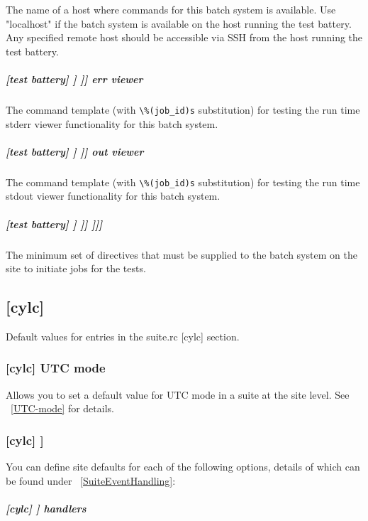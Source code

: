 The name of a host where commands for this batch system is available. Use
"localhost" if the batch system is available on the host running the test
battery. Any specified remote host should be accessible via SSH from the host
running the test battery.

\subparagraph[err viewer]{[test battery] \textrightarrow [[batch systems]] \textrightarrow [[[SYSTEM]]] \textrightarrow err viewer}

The command template (with \lstinline=\%(job_id)s= substitution) for testing
the run time stderr viewer functionality for this batch system.

\subparagraph[out viewer]{[test battery] \textrightarrow [[batch systems]] \textrightarrow [[[SYSTEM]]] \textrightarrow out viewer}

The command template (with \lstinline=\%(job_id)s= substitution) for testing
the run time stdout viewer functionality for this batch system.

\subparagraph[{[[[[}directives{]]]]}]{[test battery] \textrightarrow [[batch systems]] \textrightarrow [[[SYSTEM]]] \textrightarrow [[[[directives]]]]}

The minimum set of directives that must be supplied to the batch system on the
site to initiate jobs for the tests.

\subsection{[cylc]}

Default values for entries in the suite.rc [cylc] section.

\subsubsection[UTC mode]{[cylc] \textrightarrow UTC mode}
\label{SiteUTCMode}

Allows you to set a default value for UTC mode in a suite at the site level.
See ~\ref{UTC-mode} for details.

\subsubsection[{[}event hooks{]}]{[cylc] \textrightarrow [[event hooks]]}
\label{SiteCylcHooks}

You can define site defaults for each of the following options, details 
of which can be found under ~\ref{SuiteEventHandling}:

\subparagraph[handlers]{[cylc] \textrightarrow [[event hooks]] \textrightarrow handlers}

